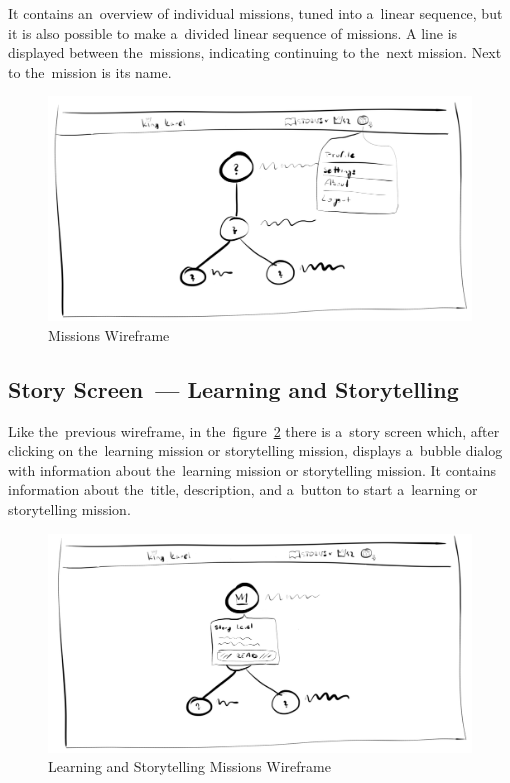 It contains an~overview of individual missions, tuned into a~linear sequence, but it is also possible to make a~divided linear sequence of missions.
A line is displayed between the~missions, indicating continuing to the~next mission.
Next to the~mission is its name.

\begin{figure}
    \centering
    \includegraphics[width=1\linewidth]{assets/design/ui/wir_stories.png}
    \caption{Missions Wireframe}
    \label{fig:design:wir:missions}
\end{figure}

\pagebreak

\subsection{Story Screen~--- Learning and Storytelling}

Like the~previous wireframe, in the~figure~\ref{fig:design:wir:story-learning} there is a~story screen which, after clicking on the~learning mission or storytelling mission, displays a~bubble dialog with information about the~learning mission or storytelling mission.
It contains information about the~title, description, and a~button to start a~learning or storytelling mission.

\begin{figure}
    \centering
    \includegraphics[width=1\linewidth]{assets/design/ui/wir_story.png}
    \caption{Learning and Storytelling Missions Wireframe}
    \label{fig:design:wir:story-learning}
\end{figure}



